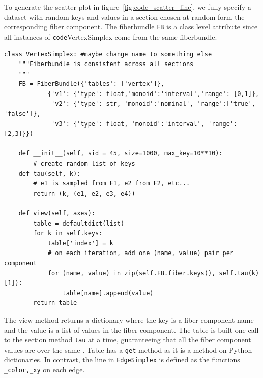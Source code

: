 \documentclass[../main.tex]{subfiles}
\begin{document}
To generate the scatter plot in figure~\ref{fig:code_scatter_line}, we fully specify a dataset with random keys and values in a section chosen at random form the corresponding fiber component. The fiberbundle \texttt{FB} is a class level attribute since all instances of \texttt{code}{VertexSimplex} come from the same fiberbundle.
\begin{verbatim}
class VertexSimplex: #maybe change name to something else
    """Fiberbundle is consistent across all sections
    """
    FB = FiberBundle({'tables': ['vertex']},  
            {'v1': {'type': float,'monoid':'interval','range': [0,1]},
             'v2': {'type': str, 'monoid':'nominal', 'range':['true', 'false']},
             'v3': {'type': float, 'monoid':'interval', 'range':[2,3]}})

    def __init__(self, sid = 45, size=1000, max_key=10**10):
        # create random list of keys
    def tau(self, k):
        # e1 is sampled from F1, e2 from F2, etc...
        return (k, (e1, e2, e3, e4))

    def view(self, axes):
        table = defaultdict(list)
        for k in self.keys:
            table['index'] = k
            # on each iteration, add one (name, value) pair per component
            for (name, value) in zip(self.FB.fiber.keys(), self.tau(k)[1]):
                table[name].append(value)
        return table
\end{verbatim}
The view method returns a dictionary where the key is a fiber component name and the value is a list of values in the fiber component. The table is built one call to the section method \texttt{tau} at a time, guaranteeing that all the fiber component values are over the same \dbasepoint. Table has a \texttt{get} method as it is a method on Python dictionaries. In contrast, the line in \texttt{EdgeSimplex} is defined as the functions \texttt{_color,_xy} on each edge. 
\end{document}
